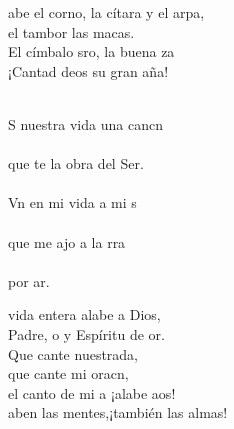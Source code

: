 \begin{cancion}%
	abe el corno, la cítara y el arpa,\\
	el tambor las macas.\\
	El címbalo sro, la buena za\\
	¡Cantad deos su gran aña!\\
	\begin{chorus}%
{}\vspace*{-0.4cm}\\
	S nuestra vida una cancn\\
{}\vspace*{-0.4cm}\\
	que te la obra del Ser.\\
{}\vspace*{-0.4cm}\\
	Vn en mi vida a mi s\\
{}\vspace*{-0.4cm}\\
	que me ajo a la rra \\
{}\vspace*{-0.4cm}\\
	por ar.           \\
	\end{chorus}%
	 vida entera alabe a Dios,\\
	Padre, o y Espíritu de or.\\
	Que cante nuestrada,\\
	que cante mi oracn,\\
	el canto de mi a ¡alabe aos!\\
	aben las mentes,¡también las almas!\\

\end{cancion}
